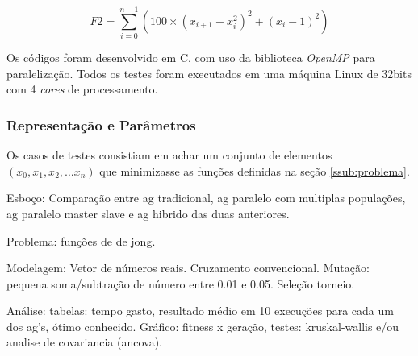 \documentclass[12pt]{article}
\begin{document}


\[
  F2 = \sum_{i = 0}^{n-1} (100 \times (x_{i+1} - x_{i}^2)^2 + (x_i - 1)^2)
\]

Os códigos foram desenvolvido em C, com uso da biblioteca \emph{OpenMP} para paralelização. Todos os testes foram executados em uma máquina Linux de 32bits com 4 \emph{cores} de processamento.




\subsubsection{Representação e Parâmetros} %
\label{ssub:representacao}

Os casos de testes consistiam em achar um conjunto de elementos $(x_0, x_1, x_2, \dots x_n)$ que minimizasse as funções definidas na seção \ref{ssub:problema}.



Esboço: Comparação entre ag tradicional, ag paralelo com multiplas populações, ag paralelo master slave e ag hibrido das duas anteriores.

Problema: funções de de jong.

Modelagem: Vetor de números reais. Cruzamento convencional. Mutação: pequena soma/subtração de número entre 0.01 e 0.05. Seleção torneio.

Análise: tabelas: tempo gasto, resultado médio em 10 execuções para cada um dos ag's, ótimo conhecido. Gráfico: fitness x geração, testes: kruskal-wallis e/ou analise de covariancia (ancova).



\end{document}
